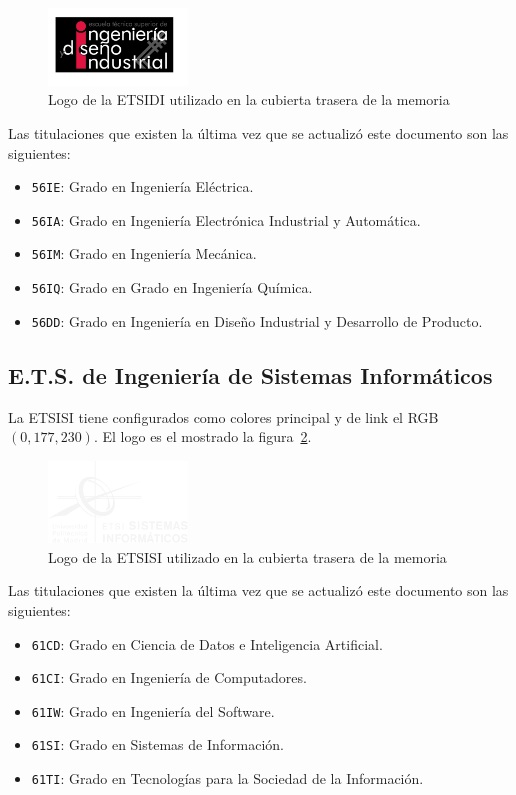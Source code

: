 \begin{figure}[h]
    \centering
    \includegraphics[width=10em]{upm-report/logos/logo-etsidi}
    \caption{\label{fig:logo-etsidi}Logo de la ETSIDI utilizado en la cubierta trasera de la memoria}
\end{figure}

Las titulaciones que existen la última vez que se actualizó este documento son las siguientes:

\begin{itemize}
    \item \texttt{56IE}: Grado en Ingeniería Eléctrica.
    \item \texttt{56IA}: Grado en Ingeniería Electrónica Industrial y Automática.
    \item \texttt{56IM}: Grado en Ingeniería Mecánica.
    \item \texttt{56IQ}: Grado en Grado en Ingeniería Química.
    \item \texttt{56DD}: Grado en Ingeniería en Diseño Industrial y Desarrollo de Producto.
\end{itemize}

\subsection{E.T.S. de Ingeniería de Sistemas Informáticos}

La ETSISI tiene configurados como colores principal y de link el RGB $(0,177,230)$. El logo es el mostrado la figura~\ref{fig:logo-etsisi}.

\begin{figure}[h]
    \centering
    \includegraphics[width=10em]{upm-report/logos/logo-etsisi}
    \caption{\label{fig:logo-etsisi}Logo de la ETSISI utilizado en la cubierta trasera de la memoria}
\end{figure}

Las titulaciones que existen la última vez que se actualizó este documento son las siguientes:

\begin{itemize}
    \item \texttt{61CD}: Grado en Ciencia de Datos e Inteligencia Artificial.
    \item \texttt{61CI}: Grado en Ingeniería de Computadores.
    \item \texttt{61IW}: Grado en Ingeniería del Software.
    \item \texttt{61SI}: Grado en Sistemas de Información.
    \item \texttt{61TI}: Grado en Tecnologías para la Sociedad de la Información.
\end{itemize}
